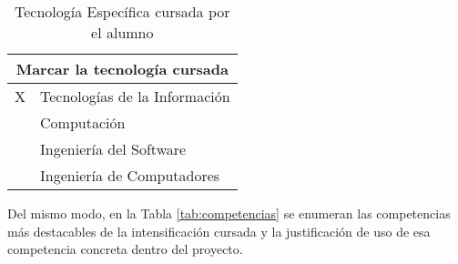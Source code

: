 \documentclass{pre-tfg}
\begin{document}
\begin{table}[hp]
  \centering
  \caption{Tecnología Específica cursada por el alumno}
  \label{tab:tec-especifica}

  \begin{tabular}{l p{}}
    \multicolumn{2}{c}{\textbf{Marcar la tecnología cursada}} \\
    \hline
    X & Tecnologías de la Información \\
    ~ & Computación                   \\
    ~ & Ingeniería del Software       \\
    ~ & Ingeniería de Computadores    \\ \hline
  \end{tabular}
\end{table}

Del mismo modo, en la Tabla \ref{tab:competencias} se enumeran las competencias más destacables de la intensificación cursada y la justificación de uso de esa competencia concreta dentro del proyecto.
\end{document}
